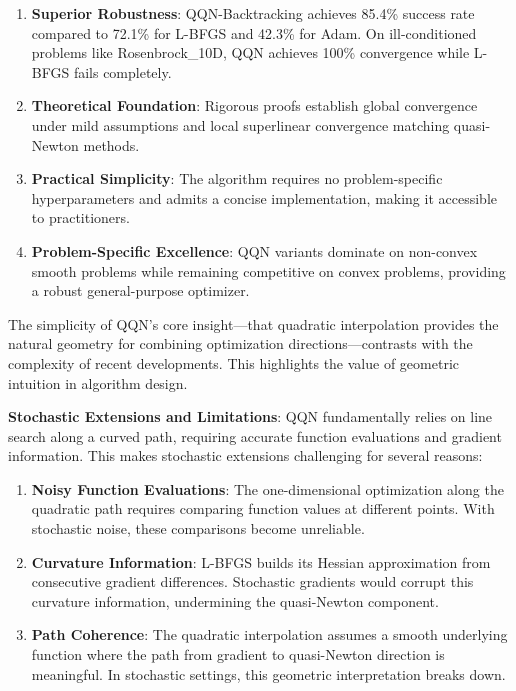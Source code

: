 \begin{enumerate}
\def\labelenumi{\arabic{enumi}.}
\item
  \textbf{Superior Robustness}: QQN-Backtracking achieves 85.4\% success rate compared to 72.1\% for L-BFGS and 42.3\%
  for Adam. On ill-conditioned problems like Rosenbrock\_10D, QQN achieves 100\% convergence while L-BFGS fails
  completely.
\item
  \textbf{Theoretical Foundation}: Rigorous proofs establish global convergence under mild assumptions and local
  superlinear convergence matching quasi-Newton methods.
\item
  \textbf{Practical Simplicity}: The algorithm requires no problem-specific hyperparameters and admits a concise
  implementation, making it accessible to practitioners.
\item
  \textbf{Problem-Specific Excellence}: QQN variants dominate on non-convex smooth problems while remaining competitive
  on convex problems, providing a robust general-purpose optimizer.
\end{enumerate}

The simplicity of QQN's core insight---that quadratic interpolation provides the natural geometry for combining optimization directions---contrasts with the complexity of recent developments.
This highlights the value of geometric intuition in algorithm design.

\textbf{Stochastic Extensions and Limitations}: QQN fundamentally relies on line search along a curved path, requiring accurate function evaluations and gradient information. This makes stochastic extensions challenging for several reasons:

\begin{enumerate}
\def\labelenumi{\arabic{enumi}.}
\item
  \textbf{Noisy Function Evaluations}: The one-dimensional optimization along the quadratic path requires comparing function values at different points. With stochastic noise, these comparisons become unreliable.
\item
  \textbf{Curvature Information}: L-BFGS builds its Hessian approximation from consecutive gradient differences. Stochastic gradients would corrupt this curvature information, undermining the quasi-Newton component.
\item
  \textbf{Path Coherence}: The quadratic interpolation assumes a smooth underlying function where the path from gradient to quasi-Newton direction is meaningful. In stochastic settings, this geometric interpretation breaks down.
\end{enumerate}

